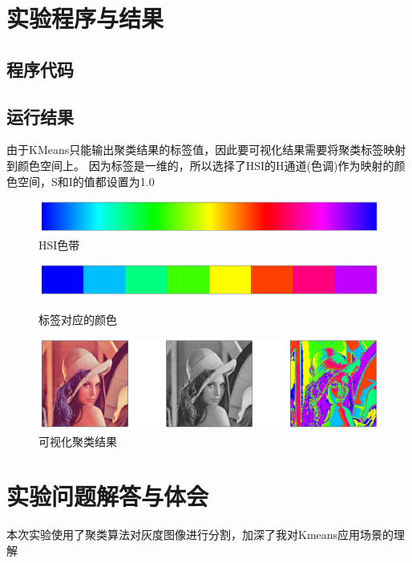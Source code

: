 \documentclass[a4paper]{ctexart}
\begin{document}
  \section{实验程序与结果}
  \subsection{程序代码}
  
  \subsection{运行结果}
  由于KMeans只能输出聚类结果的标签值，因此要可视化结果需要将聚类标签映射到颜色空间上。
  因为标签是一维的，所以选择了HSI的H通道(色调)作为映射的颜色空间，S和I的值都设置为1.0
  \begin{figure}[H]
    \includegraphics[width=1.0\textwidth]{fig/band.png}
    \caption{HSI色带}
  \end{figure}
  \newpage
  \begin{figure}[H]
    \includegraphics[width=1.0\textwidth]{fig/res.png}
    \caption{标签对应的颜色}
    \includegraphics[width=1.0\textwidth]{fig/res2.png}
    \caption{可视化聚类结果}
  \end{figure}

  \section{实验问题解答与体会}
  本次实验使用了聚类算法对灰度图像进行分割，加深了我对Kmeans应用场景的理解
\end{document}
